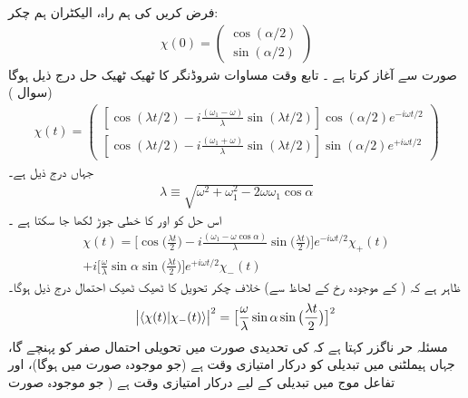 فرض کریں  کی  ہم راہ،    الیکٹران ہم چکر:
\begin{align}
\chi (0) = 
\begin{pmatrix} 
\cos(\alpha/2) \\[0.5em]
\sin(\alpha/2)
\end{pmatrix}
\end{align}
  صورت سے آغاز کرتا ہے ۔  تابع وقت مساوات شروڈنگر کا  ٹھیک ٹھیک  حل درج ذیل ہوگا  (سوال  )
\begin{align}\label{مساوات_حر_حل_مخصوص_ہیملٹنی}
\chi (t) = 
\begin{pmatrix}
[\cos(\lambda t/2) - i \frac{(\omega_1 - \omega)}{\lambda} \sin(\lambda t/2)] \cos(\alpha/2) e^{- i \omega t/2} \\[0.5em]
[\cos(\lambda t/2) - i \frac{(\omega_1 + \omega)}{\lambda} \sin(\lambda t/2)] \sin(\alpha/2) e^{+ i \omega t/2}
\end{pmatrix}
\end{align}
جہاں  درج ذیل  ہے۔
\begin{align}
\lambda \equiv \sqrt{\omega^2 + \omega_1^2 - 2 \omega \omega_1 \cos \alpha}
\end{align}
اس حل  کو   اور  کا خطی  جوڑ  لکھا جا سکتا ہے ۔
\begin{multline}\label{مساوات_حر_حل_خطی_جوڑ}
\chi (t) = \big [ \cos\big ( \frac{\lambda t}{2} \big ) - i \frac{(\omega_1 - \omega \cos \alpha)}{\lambda} \sin\big ( \frac{\lambda t}{2} \big ) \big ] e^{- i \omega t/2} \chi_{+} (t) \\
+ i \big [ \frac{\omega}{\lambda} \sin \alpha \sin \big ( \frac{\lambda t}{2} \big ) \big ] e^{+ i \omega t/2} \chi_- (t)
\end{multline}
ظاہر ہے کہ  ( کے موجودہ رخ کے لحاظ سے)  خلاف چکر  تحویل کا ٹھیک ٹھیک احتمال درج ذیل ہوگا۔ 
\begin{align}\label{مساوات_حر_تحویلی_احتمال}
\abs{\langle \chi (t) | \chi_{-} (t) \rangle}^2 = \big [ \frac{\omega}{\lambda} \sin \alpha \sin \big ( \frac{\lambda t}{2} \big ) \big ]^2
\end{align}
مسئلہ حر ناگزر کہتا ہے کہ  کی تحدیدی صورت میں تحویلی احتمال صفر کو پہنچے گا،  جہاں ہیملٹنی میں تبدیلی کو درکار امتیازی وقت  ہے  (جو موجودہ صورت میں  ہوگا)،  اور تفاعل موج میں تبدیلی کے لیے درکار امتیازی وقت  ہے ( جو موجودہ صورت 
